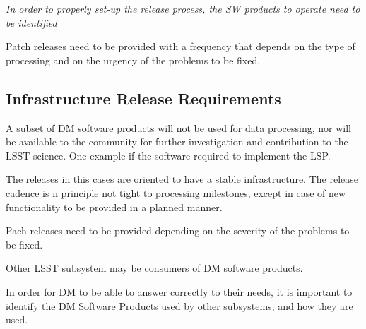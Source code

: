 \textit{In order to properly set-up the release process, the SW products to operate need to be identified}

Patch releases need to be provided with a frequency that depends on the type of processing
and on the urgency of the problems to be fixed.


\subsection{Infrastructure Release Requirements} \label{sec:infreqs}

A subset of DM software products will not be used for data processing,
nor will be available to the community for further investigation and contribution to the LSST science.
One example if the software required to implement the LSP.

The releases in this cases are oriented to have a stable infrastructure.
The release cadence is n principle not tight to processing milestones,
except in case of new functionality to be provided in a planned manner.

Pach releases need to be provided depending on the severity of the problems to be fixed.



Other LSST subsystem may be consumers of DM software products.

In order for DM to be able to answer correctly to their needs,
it is important to identify the DM Software Products used by other subsystems,
and how they are used.


